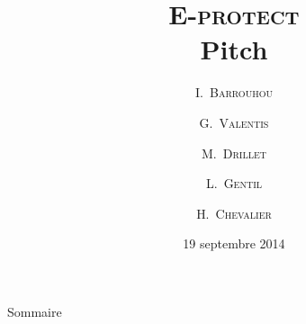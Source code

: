 \documentclass[francais]{beamer}
\title{\textsc{E-protect}\\ Pitch}
\author{I.~\textsc{Barrouhou}\inst{1} \and G.~\textsc{Valentis}\inst{1} \and M.~\textsc{Drillet}\inst{2} \and L.~\textsc{Gentil}\inst{2} \and H.~\textsc{Chevalier}\inst{3}}
\institute[ECE Paris] %
{
	ECE Paris École d'Ingénieurs\\
	\inst{1}
	Systèmes Embarqués\\
	\inst{2}
	Systèmes d'Informations\\
	\inst{3}
	Energie et Environnement\\}
\date{19 septembre 2014}
\begin{document}
\begin{frame}
  \titlepage
\end{frame}

\begin{frame}{Sommaire}{~}
  \tableofcontents
\end{frame}

% 



\end{document}
